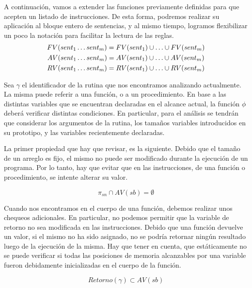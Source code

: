 \documentclass{article}
\begin{document}
A continuación, vamos a extender las funciones previamente definidas para que acepten un listado de instrucciones.
De esta forma, podremos realizar su aplicación al bloque entero de sentencias, y al mismo tiempo, logramos flexibilizar un poco la notación para facilitar la lectura de las reglas.
\begin{gather*}
FV(sent_1 \ldots sent_m) = FV(sent_1) \cup \ldots \cup FV(sent_m)
\\
AV(sent_1 \ldots sent_m) = AV(sent_1) \cup \ldots \cup AV(sent_m)
\\
RV(sent_1 \ldots sent_m) = RV(sent_1) \cup \ldots \cup RV(sent_m)
\end{gather*}

Sea $\gamma$ el identificador de la rutina que nos encontramos analizando actualmente.
La misma puede referir a una función, o a un procedimiento.
En base a las distintas variables que se encuentran declaradas en el alcance actual, la función $\phi$ deberá verificar distintas condiciones.
En particular, para el análisis se tendrán que considerar los argumentos de la rutina, los tamaños variables introducidos en su prototipo, y las variables recientemente declaradas.

La primer propiedad que hay que revisar, es la siguiente.
Debido que el tamaño de un arreglo es fijo, el mismo no puede ser modificado durante la ejecución de un programa.
Por lo tanto, hay que evitar que en las instrucciones, de una función o procedimiento, se intente alterar su valor.

\begin{equation*}
\pi_{sn} \cap AV(sb) = \emptyset
\end{equation*}

Cuando nos encontramos en el cuerpo de una función, debemos realizar unos chequeos adicionales.
En particular, no podemos permitir que la variable de retorno no sea modificada en las instrucciones.
Debido que una función devuelve un valor, si el mismo no ha sido asignado, no se podría retornar ningún resultado luego de la ejecución de la misma.
Hay que tener en cuenta, que estáticamente no se puede verificar si todas las posiciones de memoria alcanzables por una variable fueron debidamente inicializadas en el cuerpo de la función.

\begin{equation*}
Retorno(\gamma) \subset AV(sb)
\end{equation*}
\end{document}
